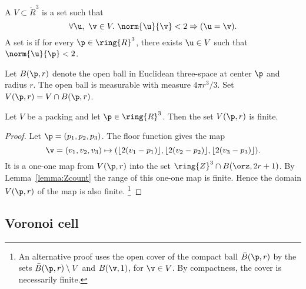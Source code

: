 \begin{definition} 
A  $ V\subset \ring{R}^3$ is a set such that
\begin{displaymath}
\forall  \u,~\v\in  V.~  \norm{ \u}{\v} < 2 \Rightarrow ( \u=\v).
\end{displaymath} 
A set is  if for every $\p\in\ring{R}^3$, there
exists $ \u\in V$ such that $\norm{ \u}{\p}< 2$.
\end{definition}
%
%



Let $B(\p,r)$ denote the open ball in
Euclidean three-space at center $\p$ and radius $r$.  The open ball
is measurable with measure $4\pi r^3/3$.
 Set $ V(\p,r) = V \cap
B(\p,r)$. %
%
%

\begin{lemma}[]
\label{lemma:V-finite}
Let $ V$ be a packing and let $\p\in\ring{R}^3$.
Then the set $ V(\p,r)$ is finite.
\end{lemma}

\begin{proof}  Let $\p = (p_1,p_2,p_3)$. The floor function gives the map
\begin{displaymath}\v=(v_1,v_2,v_3)\mapsto (\lfloor 2(v_1-p_1)
  \rfloor, \lfloor 2(v_2-p_2) \rfloor, \lfloor 2(v_3-p_3) \rfloor).
\end{displaymath}
It is a one-one map from $ V(\p,r)$ into the set $\ring{Z}^3\cap B(\orz,2r + 1)$.  
By Lemma~\ref{lemma:Zcount} the range of this one-one map is finite. 
Hence the domain $ V(\p,r)$ of the map is also finite.%
\footnote{An alternative proof uses the open cover of the compact ball 
$\bar B(\p,r)$ by the sets $\bar B(\p,r)\setminus V$ and $B(\v,1)$, 
for $\v\in V$. By compactness, the cover is necessarily finite.}
\end{proof}
%






\subsection{Voronoi cell}

